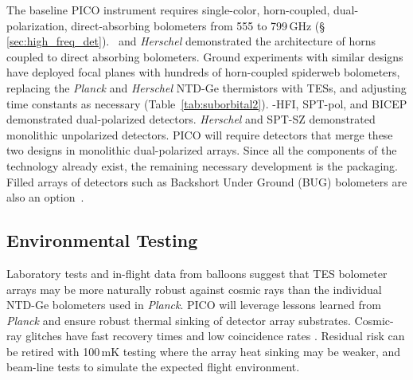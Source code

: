 The baseline PICO instrument requires single-color, horn-coupled, dual-polarization, direct-absorbing bolometers from 555 to 799\,GHz (\S\,\ref{sec:high_freq_det}).  \planck\ and \textit{Herschel} demonstrated the architecture of horns coupled to direct absorbing bolometers. 
Ground experiments with similar designs have deployed focal planes with hundreds of horn-coupled spiderweb bolometers, replacing the \textit{Planck} and \textit{Herschel} NTD-Ge thermistors with TESs, and adjusting time constants as necessary (Table~\ref{tab:suborbital2}). \planck -HFI, SPT-pol, and BICEP demonstrated dual-polarized detectors. \textit{Herschel} and SPT-SZ demonstrated monolithic unpolarized detectors. PICO will require detectors that merge these two designs in monolithic dual-polarized arrays. Since all the components of the technology already exist, the remaining necessary development is the packaging. Filled arrays of detectors such as Backshort Under Ground (BUG) bolometers are also an option~\citep{Staguhn2006}.




\subsection{Environmental Testing}
\label{sec:env_testing}


Laboratory tests and in-flight data from balloons suggest that TES
bolometer arrays may be more naturally robust against cosmic rays than
the individual NTD-Ge bolometers used in \textit{Planck}. PICO will leverage lessons
learned from \textit{Planck} and ensure robust thermal sinking of
detector array substrates. Cosmic-ray
glitches have fast recovery times and low coincidence rates
\citep{SPIDER2018,Filippini_inprep}. Residual risk can be retired with 100\,mK
testing where the array heat sinking may be weaker, and beam-line
tests to simulate the expected flight environment.

